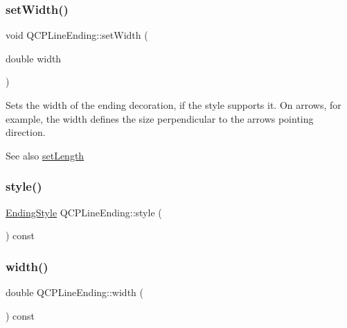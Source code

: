 \subsubsection{\texorpdfstring{set\+Width()}{setWidth()}}
{\footnotesize\ttfamily void Q\+C\+P\+Line\+Ending\+::set\+Width (\begin{DoxyParamCaption}\item[{double}]{width }\end{DoxyParamCaption})}

Sets the width of the ending decoration, if the style supports it. On arrows, for example, the width defines the size perpendicular to the arrow\textquotesingle{}s pointing direction.

\begin{DoxySeeAlso}{See also}
\hyperlink{class_q_c_p_line_ending_ae36fa01763751cd64b7f56c3507e935a}{set\+Length} 
\end{DoxySeeAlso}
\mbox{\label{class_q_c_p_line_ending_a07e75aaac6c61322bf51af237c5778e3}} 
\subsubsection{\texorpdfstring{style()}{style()}}
{\footnotesize\ttfamily \hyperlink{class_q_c_p_line_ending_a5ef16e6876b4b74959c7261d8d4c2cd5}{Ending\+Style} Q\+C\+P\+Line\+Ending\+::style (\begin{DoxyParamCaption}{ }\end{DoxyParamCaption}) const\hspace{0.3cm}{\ttfamily [inline]}}

\mbox{\label{class_q_c_p_line_ending_ae6f1fb83c210da6ace35d629993287f3}} 
\subsubsection{\texorpdfstring{width()}{width()}}
{\footnotesize\ttfamily double Q\+C\+P\+Line\+Ending\+::width (\begin{DoxyParamCaption}{ }\end{DoxyParamCaption}) const\hspace{0.3cm}{\ttfamily [inline]}}



